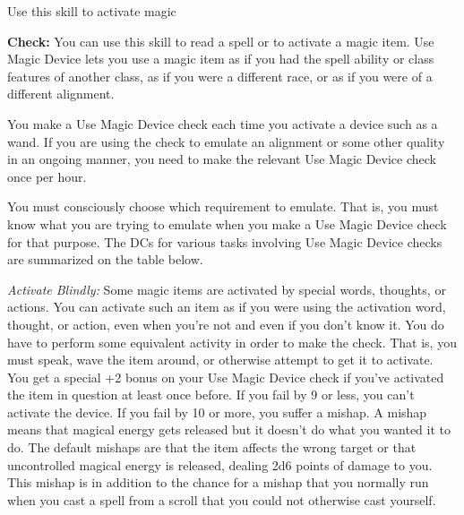 Use this skill to activate magic

\textbf{Check:} You can use this skill to read a spell or to activate a magic item. Use Magic Device lets you use a magic item as if you had the spell ability or class features of another class, as if you were a different race, or as if you were of a different alignment.

You make a Use Magic Device check each time you activate a device such as a wand. If you are using the check to emulate an alignment or some other quality in an ongoing manner, you need to make the relevant Use Magic Device check once per hour.

You must consciously choose which requirement to emulate. That is, you must know what you are trying to emulate when you make a Use Magic Device check for that purpose. The DCs for various tasks involving Use Magic Device checks are summarized on the table below.


\textit{Activate Blindly:} Some magic items are activated by special words, thoughts, or actions. You can activate such an item as if you were using the activation word, thought, or action, even when you’re not and even if you don’t know it. You do have to perform some equivalent activity in order to make the check. That is, you must speak, wave the item around, or otherwise attempt to get it to activate. You get a special +2 bonus on your Use Magic Device check if you’ve activated the item in question at least once before. If you fail by 9 or less, you can’t activate the device. If you fail by 10 or more, you suffer a mishap. A mishap means that magical energy gets released but it doesn’t do what you wanted it to do. The default mishaps are that the item affects the wrong target or that uncontrolled magical energy is released, dealing 2d6 points of damage to you. This mishap is in addition to the chance for a mishap that you normally run when you cast a spell from a scroll that you could not otherwise cast yourself.

